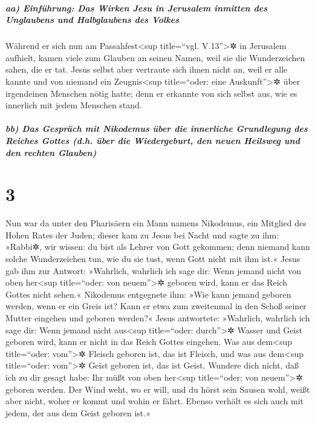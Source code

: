 \hypertarget{aa-einfuxfchrung-das-wirken-jesu-in-jerusalem-inmitten-des-unglaubens-und-halbglaubens-des-volkes}{%
\subparagraph{aa) Einführung: Das Wirken Jesu in Jerusalem inmitten des
Unglaubens und Halbglaubens des
Volkes}\label{aa-einfuxfchrung-das-wirken-jesu-in-jerusalem-inmitten-des-unglaubens-und-halbglaubens-des-volkes}}

 Während er sich nun am Passahfest\textless sup
title=``vgl. V.13''\textgreater✲ in Jerusalem aufhielt, kamen viele zum
Glauben an seinen Namen, weil sie die Wunderzeichen sahen, die er tat.
 Jesus selbst aber vertraute sich ihnen nicht an, weil er
alle kannte  und von niemand ein Zeugnis\textless sup
title=``oder: eine Auskunft''\textgreater✲ über irgendeinen Menschen
nötig hatte; denn er erkannte von sich selbst aus, wie es innerlich mit
jedem Menschen stand.

\hypertarget{bb-das-gespruxe4ch-mit-nikodemus-uxfcber-die-innerliche-grundlegung-des-reiches-gottes-d.h.-uxfcber-die-wiedergeburt-den-neuen-heilsweg-und-den-rechten-glauben}{%
\subparagraph{bb) Das Gespräch mit Nikodemus über die innerliche
Grundlegung des Reiches Gottes (d.h. über die Wiedergeburt, den neuen
Heilsweg und den rechten
Glauben)}\label{bb-das-gespruxe4ch-mit-nikodemus-uxfcber-die-innerliche-grundlegung-des-reiches-gottes-d.h.-uxfcber-die-wiedergeburt-den-neuen-heilsweg-und-den-rechten-glauben}}

\hypertarget{section-2}{%
\section{3}\label{section-2}}

 Nun war da unter den Pharisäern ein Mann namens
Nikodemus, ein Mitglied des Hohen Rates der Juden;  dieser
kam zu Jesus bei Nacht und sagte zu ihm: »Rabbi✲, wir wissen: du bist
als Lehrer von Gott gekommen; denn niemand kann solche Wunderzeichen
tun, wie du sie tust, wenn Gott nicht mit ihm ist.«  Jesus
gab ihm zur Antwort: »Wahrlich, wahrlich ich sage dir: Wenn jemand nicht
von oben her\textless sup title=``oder: von neuem''\textgreater✲ geboren
wird, kann er das Reich Gottes nicht sehen.«  Nikodemus
entgegnete ihm: »Wie kann jemand geboren werden, wenn er ein Greis ist?
Kann er etwa zum zweitenmal in den Schoß seiner Mutter eingehen und
geboren werden?«  Jesus antwortete: »Wahrlich, wahrlich
ich sage dir: Wenn jemand nicht aus\textless sup title=``oder:
durch''\textgreater✲ Wasser und Geist geboren wird, kann er nicht in das
Reich Gottes eingehen.  Was aus dem\textless sup
title=``oder: vom''\textgreater✲ Fleisch geboren ist, das ist Fleisch,
und was aus dem\textless sup title=``oder: vom''\textgreater✲ Geist
geboren ist, das ist Geist.  Wundere dich nicht, daß ich
zu dir gesagt habe: Ihr müßt von oben her\textless sup title=``oder: von
neuem''\textgreater✲ geboren werden.  Der Wind weht, wo er
will, und du hörst sein Sausen wohl, weißt aber nicht, woher er kommt
und wohin er fährt. Ebenso verhält es sich auch mit jedem, der aus dem
Geist geboren ist.«

